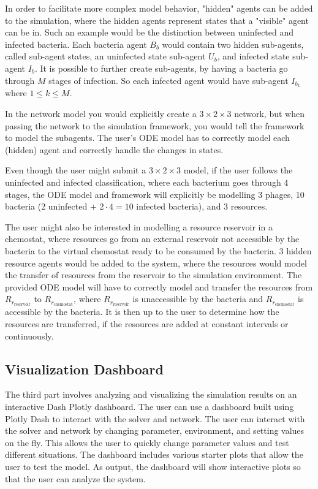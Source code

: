 In order to facilitate more complex model behavior, "hidden" agents can be added to the simulation, where the hidden agents represent states that a "visible" agent can be in. 
Such an example would be the distinction between uninfected and infected bacteria. 
Each bacteria agent $B_b$ would contain two hidden sub-agents, called sub-agent states, an uninfected state sub-agent $U_b$, and infected state sub-agent $I_b$. 
It is possible to further create sub-agents, by having a bacteria go through $M$ stages of infection. 
So each infected agent would have sub-agent $I_{b_k}$ where $1 \leq k \leq M$. 

In the network model you would explicitly create a $3\times 2 \times 3$ network, but when passing the network to the simulation framework, you would tell the framework to model the subagents. 
The user's ODE model has to correctly model each (hidden) agent and correctly handle the changes in states. 

Even though the user might submit a $3 \times 2 \times 3$ model, if the user follows the uninfected and infected classification, where each bacterium goes through $4$ stages, the ODE model and framework will explicitly be modelling 3 phages, 10 bacteria (2 uninfected + $2\cdot 4=10$ infected bacteria), and 3 resources. 

The user might also be interested in modelling a resource reservoir in a chemostat, where resources go from an external reservoir not accessible by the bacteria to the virtual chemostat ready to be consumed by the bacteria. 
3 hidden resource agents would be added to the system, where the resources would model the transfer of resources from the reservoir to the simulation environment. 
The provided ODE model will have to correctly model and transfer the resources from $R_{r_{\text{reservoir}}}$ to $R_{r_{\text{chemostat}}}$, where $R_{r_{\text{reservoir}}}$ is unaccessible by the bacteria and $R_{r_{\text{chemostat}}}$ is accessible by the bacteria. 
It is then up to the user to determine how the resources are transferred, if the resources are added at constant intervals or continuously. 

\subsection{Visualization Dashboard}
\label{sec:visualization_framework}
The third part involves analyzing and visualizing the simulation results on an interactive Dash Plotly \cite{DashDocumentationUser} dashboard. 
The user can use a dashboard built using Plotly Dash to interact with the solver and network.
The user can interact with the solver and network by changing parameter, environment, and setting values on the fly.
This allows the user to quickly change parameter values and test different situations.
The dashboard includes various starter plots that allow the user to test the model.
As output, the dashboard will show interactive plots so that the user can analyze the system. 

